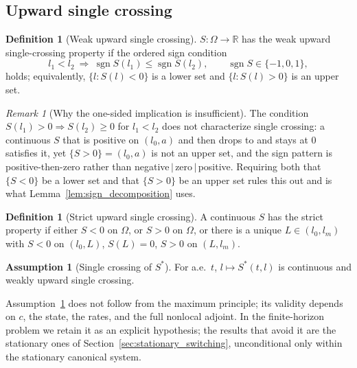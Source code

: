 \documentclass[pdflatex,sn-mathphys-num]{sn-jnl}
\newcommand{\R}{\mathbb{R}}
\newcommand{\Om}{\Omega}
\theoremstyle{plain}
\theoremstyle{definition}
\newtheorem{definition}[theorem]{Definition}
\newtheorem{assumption}[theorem]{Assumption}
\theoremstyle{remark}
\newtheorem{remark}[theorem]{Remark}
\begin{document}
\subsection{Upward single crossing}
\label{subsec:single_crossing_definition}

\begin{definition}[Weak upward single crossing]
\label{def:weak_single_crossing}
$S:\Om\to\R$ has the weak upward single-crossing property if the ordered sign
condition
\begin{equation}\label{eq:ordered_sign}
l_1<l_2\ \Longrightarrow\ \operatorname{sgn}S(l_1)\le\operatorname{sgn}S(l_2),
\qquad\operatorname{sgn}S\in\{-1,0,1\},
\end{equation}
holds; equivalently, $\{l:S(l)<0\}$ is a lower set and $\{l:S(l)>0\}$ is an
upper set.
\end{definition}

\begin{remark}[Why the one-sided implication is insufficient]
\label{rmk:single_crossing_pitfall}
The condition $S(l_1)>0\Rightarrow S(l_2)\ge0$ for $l_1<l_2$ does not
characterize single crossing: a continuous $S$ that is positive on $(l_0,a)$ and
then drops to and stays at $0$ satisfies it, yet $\{S>0\}=(l_0,a)$ is not an upper
set, and the sign pattern is positive-then-zero rather than
negative$\,|\,$zero$\,|\,$positive. Requiring both that $\{S<0\}$ be a
lower set and that $\{S>0\}$ be an upper set rules this out and is what
Lemma~\ref{lem:sign_decomposition} uses.
\end{remark}

\begin{definition}[Strict upward single crossing]
\label{def:strict_single_crossing}
A continuous $S$ has the strict property if either $S<0$ on $\Om$, or $S>0$ on
$\Om$, or there is a unique $L\in(l_0,l_m)$ with $S<0$ on $(l_0,L)$, $S(L)=0$,
$S>0$ on $(L,l_m)$.
\end{definition}

\begin{assumption}[Single crossing of $S^*$]
\label{ass:single_crossing}
For a.e.\ $t$, $l\mapsto S^*(t,l)$ is continuous and weakly upward single crossing.
\end{assumption}

Assumption~\ref{ass:single_crossing} does not follow from the maximum principle;
its validity depends on $c$, the state, the rates, and the full nonlocal adjoint.
In the finite-horizon problem we retain it as an explicit hypothesis; the results
that avoid it are the stationary ones of
Section~\ref{sec:stationary_switching}, unconditional only within the stationary
canonical system.
\end{document}
